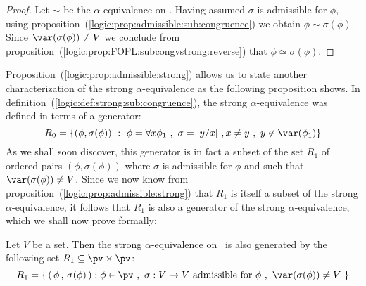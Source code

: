 \noindent
\begin{proof}
Let $\sim$ be the $\alpha$-equivalence on \pv. Having assumed
$\sigma$ is admissible for $\phi$, using
proposition~(\ref{logic:prop:admissible:sub:congruence}) we obtain
$\phi\sim\sigma(\phi)$. Since $\var(\sigma(\phi))\neq V$ we conclude
from proposition~(\ref{logic:prop:FOPL:subcongvstrong:reverse}) that
$\phi\simeq\sigma(\phi)$.
\end{proof}

Proposition~(\ref{logic:prop:admissible:strong}) allows us to state
another characterization of the strong $\alpha$-equivalence as
the following proposition shows. In
definition~(\ref{logic:def:strong:sub:congruence}), the strong 
$\alpha$-equivalence was defined in terms of a generator:
 \[
    R_{0}=\{(\phi,\sigma(\phi))\ :\ \phi=\forall x\phi_{1}\ ,\
    \sigma=[y/x]\ ,x\neq y\ , \ y\not\in\var(\phi_{1})\}
 \]
As we shall soon discover, this generator is in fact a subset of the
set $R_{1}$ of ordered pairs $(\phi,\sigma(\phi))$ where $\sigma$ is
admissible for $\phi$ and such that $\var(\sigma(\phi))\neq V$.
Since we now know from
proposition~(\ref{logic:prop:admissible:strong}) that $R_{1}$ is
itself a subset of the strong $\alpha$-equivalence, it follows
that $R_{1}$ is also a generator of the strong $\alpha$-equivalence, 
which we shall now prove formally:

\begin{prop}\label{logic:prop:strong:quant:congruence:from:admissible}
Let $V$ be a set. Then the strong $\alpha$-equivalence on \pv\ is
also generated by the following set $R_{1}\subseteq \pv\times\pv$:
    \[
    R_{1}=\left\{\,(\,\phi\,,\,\sigma(\phi)\,):\phi\in\pv\ ,\
    \mbox{$\sigma:V\to V$ admissible for $\phi$}\ ,\
    \var(\sigma(\phi))\neq V\ \right\}
    \]
\end{prop}

